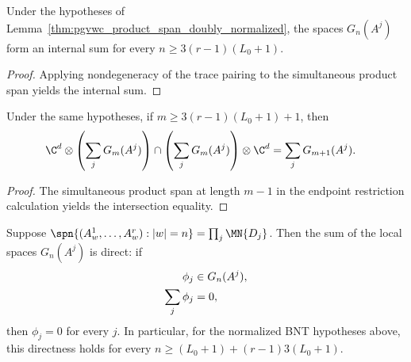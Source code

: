 \begin{lemma}
    \label{thm:pgvwc_block_space_independence_doubly_normalized}
    \leanok
    Under the hypotheses of
    Lemma~\ref{thm:pgvwc_product_span_doubly_normalized}, the spaces
    $G_n(A^j)$ form an internal sum for every
    $n\ge3(r-1)(L_0+1)$.
\end{lemma}

\begin{proof}
    \leanok
    Applying nondegeneracy of the trace pairing to the simultaneous product span
    yields the internal sum.
\end{proof}

\begin{lemma}
    \label{thm:pgvwc_direct_sum_intersection_doubly_normalized}
    \leanok
    Under the same hypotheses, if $m\ge3(r-1)(L_0+1)+1$, then
    \begin{align}
        \C^d\otimes\left(\sum_jG_m(A^j)\right)
        \cap\left(\sum_jG_m(A^j)\right)\otimes\C^d
         & =\sum_jG_{m+1}(A^j). \notag
    \end{align}
\end{lemma}

\begin{proof}
    \leanok
    The simultaneous product span at length $m-1$ in the endpoint
    restriction calculation yields the intersection equality.
\end{proof}

\begin{lemma}
    \label{lem:product_span_block_image_direct_sum}
    \leanok
    Suppose
    $\spn\{(A^1_w,\ldots,A^r_w):|w|=n\} = \prod_j\MN{D_j}$.
    Then the sum of the local spaces $G_n(A^j)$ is direct: if
    \begin{align}
        \phi_j       & \in G_n(A^j),
        \notag                       \\
        \sum_j\phi_j & =0,
        \notag
    \end{align}
    then $\phi_j=0$ for every $j$. In particular, for the normalized BNT
    hypotheses above, this directness holds for every
    $n\ge (L_0+1)+(r-1)3(L_0+1)$.
\end{lemma}

